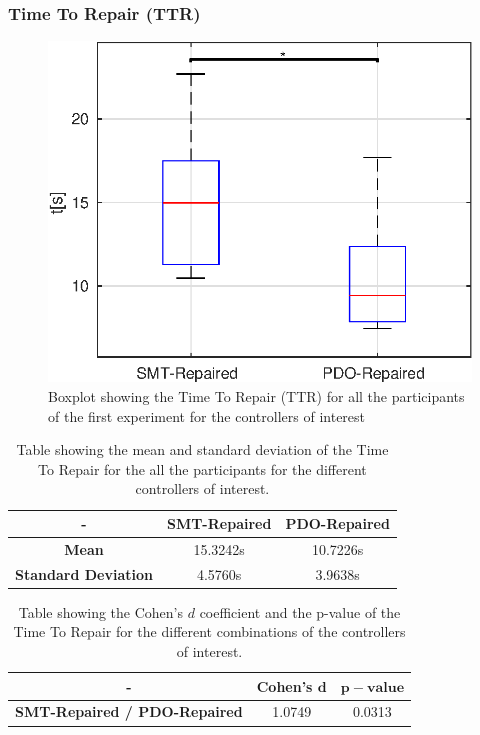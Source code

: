 \subsubsection{Time To Repair (TTR)}\label{subsub:first-TTR}
\begin{figure}[H]
    \centering
    \includegraphics[width=\textwidth]{Images/first-experiment/exp0_time_to_repair.eps}
    \caption{Boxplot showing the Time To Repair (TTR) for all the participants of the first experiment for the controllers of interest}
    \label{fig:box-TTR-first}
\end{figure}
\begin{table}[H]
    \centering
    \begin{tabular}{|c|c|c|}
        \hline
        - & \textbf{SMT-Repaired} & \textbf{PDO-Repaired} \\
        \hline
        \textbf{Mean} & 15.3242s & 10.7226s \\
        \textbf{Standard Deviation} & 4.5760s & 3.9638s \\
        \hline
    \end{tabular}
    \caption{Table showing the mean and standard deviation of the Time To Repair for the all the participants for the different controllers of interest.}
    \label{tab:TTR-first-mean-std}
\end{table}
\begin{table}[H]
    \centering
    \begin{tabular}{|c|c|c|}
        \hline
        - & \textbf{Cohen's} $\mathbf{d}$ & $\mathbf{p-value}$ \\
        \hline
        \textbf{SMT-Repaired / PDO-Repaired} & 1.0749 & 0.0313 \\
        \hline
    \end{tabular}
    \caption{Table showing the Cohen's $d$ coefficient and the p-value of the Time To Repair for the different combinations of the controllers of interest.}
    \label{tab:TTR-first-cohen-p}
\end{table}
